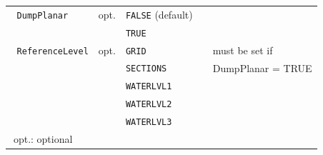 \begin{table}[ht]
\begin{tabular}{| l | l | l | l | p{4.5cm} |}
{\textcolor{white}{\LARGE |}} \texttt{DumpPlanar}     &opt. &\texttt{FALSE} (\small{default}) &             &                     \\
{\textcolor{white}{\LARGE |}}                         &     &\texttt{TRUE}                    &             &                     \\ \hline
{\textcolor{white}{\LARGE |}} \texttt{ReferenceLevel} &opt. &\texttt{GRID}          &                       &must be set if       \\
{\textcolor{white}{\LARGE |}}                         &     &\texttt{SECTIONS}      &                       &DumpPlanar = TRUE    \\
{\textcolor{white}{\LARGE |}}                         &     &\texttt{WATERLVL1}     &                       &                     \\
{\textcolor{white}{\LARGE |}}                         &     &\texttt{WATERLVL2}     &                       &                     \\
{\textcolor{white}{\LARGE |}}                         &     &\texttt{WATERLVL3}     &                       &                     \\ \hline
\multicolumn{5}{|l|}{{\textcolor{white}{\LARGE |}}\small{opt.: optional}}                                                        \\ \hline
\end{tabular}
\end{table}


